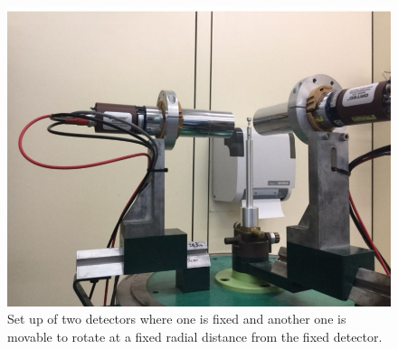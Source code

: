 \begin{figure}[ht]
	\centering
	\includegraphics[width=0.8\linewidth]{./figs/detectors.jpg}
	\caption{Set up of two detectors where one is fixed and another one is movable to rotate at a fixed radial distance from the fixed detector.}%
	\label{fig:angAsymm}
\end{figure}


